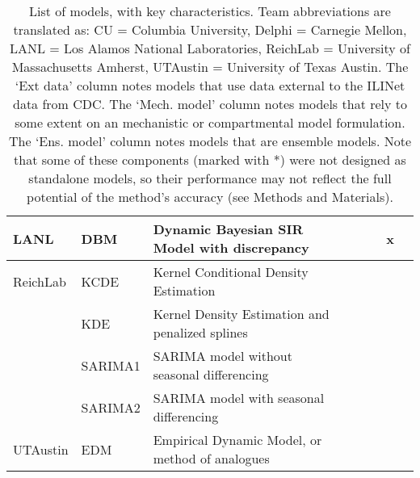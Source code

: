 \begin{table*}
\begin{tabular}{p{1.6cm} l p{7.5cm} l  p{1cm}  p{1cm} p{1cm}}
\hline
LANL     & DBM                & Dynamic Bayesian SIR Model with discrepancy & \cite{osthus2018dynamic} & ~             & x      &              \\ 
\hline
ReichLab & KCDE               & Kernel Conditional Density Estimation & \cite{Ray2017}  & ~             & ~            &        \\ 
~        & KDE                & Kernel Density Estimation and penalized splines & \cite{Ray2018}  & ~             & ~     &               \\ 
~        & SARIMA1            & SARIMA model without seasonal differencing & \cite{Ray2018} & ~             & ~      &              \\ 
~        & SARIMA2            & SARIMA model with seasonal differencing & \cite{Ray2018} & ~             & ~           &         \\ 
\hline
UTAustin & EDM                & Empirical Dynamic Model, or method of analogues & \cite{Sugihara1990} & ~             & ~         &           \\ 
\end{tabular}
\caption{List of models, with key characteristics. Team abbreviations are translated as: CU = Columbia University, Delphi = Carnegie Mellon, LANL = Los Alamos National Laboratories, ReichLab = University of Massachusetts Amherst, UTAustin = University of Texas Austin.  The `Ext data' column notes models that use data external to the ILINet data from CDC. The `Mech. model' column notes models that rely to some extent on an mechanistic or compartmental model formulation. The `Ens. model' column notes models that are ensemble models. Note that some of these components (marked with *) were not designed as standalone models, so their performance may not reflect the full potential of the method's accuracy (see Methods and Materials).}
\label{tab:model-list}
\end{table*}